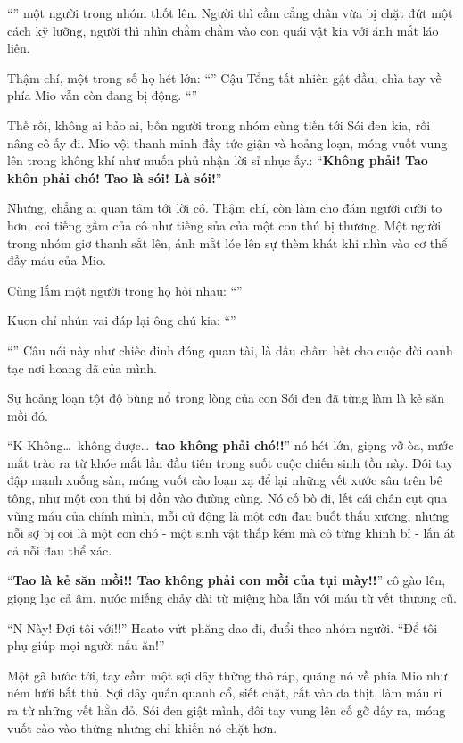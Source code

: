 \documentclass[../main.tex]{subfiles}
\begin{document}
``\textbf{}'' một người trong nhóm thốt lên. Người thì cầm cẳng chân vừa bị chặt đứt một cách kỹ lưỡng, người thì nhìn chằm chằm vào con quái vật kia với ánh mắt láo liên.

Thậm chí, một trong số họ hét lớn: ``\textbf{}'' Cậu Tổng tất nhiên gật đầu, chìa tay về phía Mio vẫn còn đang bị động. ``''

Thế rồi, không ai bảo ai, bốn người trong nhóm cùng tiến tới Sói đen kia, rồi nâng cô ấy đi. Mio vội thanh minh đầy tức giận và hoảng loạn, móng vuốt vung lên trong không khí như muốn phủ nhận lời sỉ nhục ấy.: ``\textbf{Không phải! Tao khôn phải chó! Tao là sói! Là sói!}''

Nhưng, chẳng ai quan tâm tới lời cô. Thậm chí, còn làm cho đám người cười to hơn, coi tiếng gầm của cô như tiếng sủa của một con thú bị thương. Một người trong nhóm giơ thanh sắt lên, ánh mắt lóe lên sự thèm khát khi nhìn vào cơ thể đầy máu của Mio.

Cùng lắm một người trong họ hỏi nhau: ``''

Kuon chỉ nhún vai đáp lại ông chú kia: ``''

``'' Câu nói này như chiếc đinh đóng quan tài, là dấu chấm hết cho cuộc đời oanh tạc nơi hoang dã của mình.

Sự hoảng loạn tột độ bùng nổ trong lòng của con Sói đen đã từng làm là kẻ săn mồi đó.

``K-Không\dots\ không được\dots\ \textbf{tao không phải chó!!}'' nó hét lớn, giọng vỡ òa, nước mắt trào ra từ khóe mắt lần đầu tiên trong suốt cuộc chiến sinh tồn này. Đôi tay đập mạnh xuống sàn, móng vuốt cào loạn xạ để lại những vết xước sâu trên bê tông, như một con thú bị dồn vào đường cùng.  Nó cố bò đi, lết cái chân cụt qua vũng máu của chính mình, mỗi cử động là một cơn đau buốt thấu xương, nhưng nỗi sợ bị coi là một con chó - một sinh vật thấp kém mà cô từng khinh bỉ - lấn át cả nỗi đau thể xác.

``\textbf{Tao là kẻ săn mồi!! Tao không phải con mồi của tụi mày!!}'' cô gào lên, giọng lạc cả âm, nước miếng chảy dài từ miệng hòa lẫn với máu từ vết thương cũ.

``N-Này! Đợi tôi với!!'' Haato vứt phăng dao đi, đuổi theo nhóm người. ``Để tôi phụ giúp mọi người nấu ăn!''

Một gã bước tới, tay cầm một sợi dây thừng thô ráp, quăng nó về phía Mio như ném lưới bắt thú. Sợi dây quấn quanh cổ, siết chặt, cắt vào da thịt, làm máu rỉ ra từ những vết hằn đỏ. Sói đen giật mình, đôi tay vung lên cố gỡ dây ra, móng vuốt cào vào thừng nhưng chỉ khiến nó chặt hơn.
\end{document}
